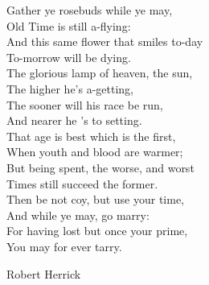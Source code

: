\pagestyle{empty}  %

\null\vfill
Gather ye rosebuds while ye may,\\
Old Time is still a-flying:\\
And this same flower that smiles to-day\\
To-morrow will be dying.\\
 
The glorious lamp of heaven, the sun,\\
The higher he's a-getting,\\
The sooner will his race be run,\\
And nearer he 's to setting.\\
 
That age is best which is the first,\\
When youth and blood are warmer;\\
But being spent, the worse, and worst\\
Times still succeed the former.\\
 
Then be not coy, but use your time,\\
And while ye may, go marry:\\
For having lost but once your prime,\\
You may for ever tarry.\\

\begin{flushright}
Robert Herrick
\end{flushright}

\vfill\vfill\vfill\vfill\vfill\vfill\null
\clearpage  %
